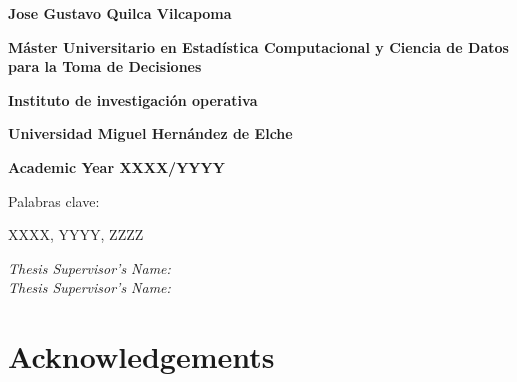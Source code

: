 \documentclass[openany]{article}
\begin{document}
\begin{titlepage}
{\flushleft \LARGE \bfseries Jose Gustavo Quilca Vilcapoma \par}\vspace{1.5cm}

{\flushleft \Large \bfseries Máster Universitario en Estadística Computacional y Ciencia de Datos para la Toma de Decisiones\par}\vspace{0.cm}
{\flushleft \Large \bfseries Instituto de investigación operativa\par}\vspace{0.cm}
{\flushleft \Large \bfseries Universidad Miguel Hernández de Elche\par}\vspace{0.cm}
{\flushleft \small \bfseries Academic Year XXXX/YYYY\par}\vspace{1.5cm}

{\flushleft \normalsize Palabras clave:\par}\vspace{0cm}

{XXXX, YYYY, ZZZZ \par}
\vspace{1.5cm}

{\flushleft \normalsize \textit{Thesis Supervisor’s Name: }\\}\vspace{0cm}
{\flushleft \normalsize \textit{Thesis Supervisor’s Name: }\\}\vspace{0cm}

\end{titlepage}

\clearpage\thispagestyle{empty}\null\newpage %
	
\newpage
\thispagestyle{plain}

\mbox{}\par 
\vspace{4.5cm}


\clearpage\thispagestyle{empty}\null\newpage %
	
\newpage
\thispagestyle{plain}
\section*{Acknowledgements}
    
\end{document}
